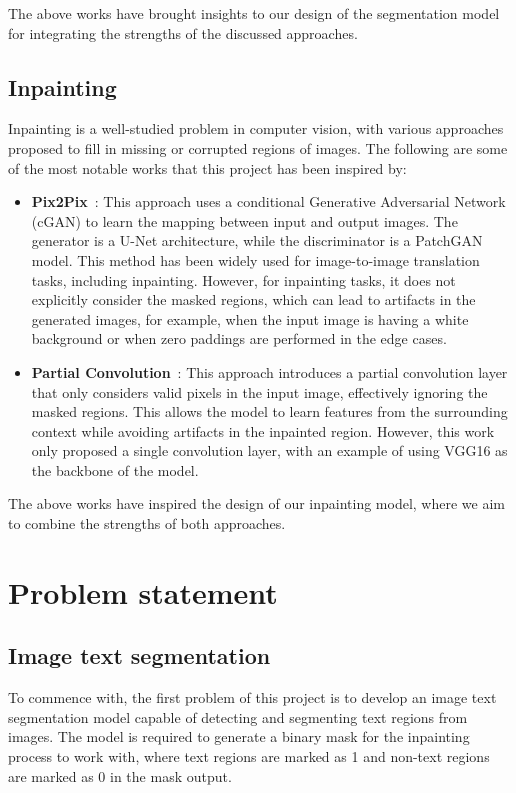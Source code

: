 \documentclass[10pt,twocolumn,letterpaper]{article}
\begin{document}
The above works have brought insights to our design of the segmentation model for integrating the strengths of the discussed approaches.

\subsection{Inpainting}

Inpainting is a well-studied problem in computer vision, with various approaches proposed to fill in missing or corrupted regions of images.
The following are some of the most notable works that this project has been inspired by:

\begin{itemize}
    \item \textbf{Pix2Pix}~\cite{Isola2018}: This approach uses a conditional Generative Adversarial Network (cGAN) to learn the mapping between input and output images. 
    The generator is a U-Net architecture, while the discriminator is a PatchGAN model. This method has been widely used for image-to-image translation tasks, including inpainting.
    However, for inpainting tasks, it does not explicitly consider the masked regions, which can lead to artifacts in the generated images, for example, when the input image is having a 
    white background or when zero paddings are performed in the edge cases.
    \item \textbf{Partial Convolution}~\cite{Liu2018}: This approach introduces a partial convolution layer that only considers valid pixels in the input image, 
    effectively ignoring the masked regions. This allows the model to learn features from the surrounding context while avoiding artifacts in the inpainted region.
    However, this work only proposed a single convolution layer, with an example of using VGG16 as the backbone of the model.
\end{itemize}

The above works have inspired the design of our inpainting model, where we aim to combine the strengths of both approaches.

\section{Problem statement}

\subsection{Image text segmentation}
To commence with, the first problem of this project is to develop an image text segmentation model capable of detecting and segmenting text regions from images. 
The model is required to generate a binary mask for the inpainting process to work with, where text regions are marked as 1 and non-text regions are marked as 0 in the mask output.
\end{document}
